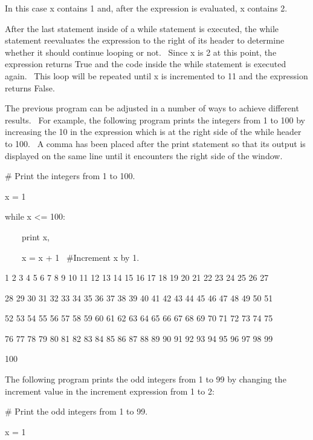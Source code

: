 \documentclass[12pt,twoside]{book}
\begin{document}
\bigskip

In this case x contains 1 and, after the expression is evaluated, x contains 2.


\bigskip

After the last statement inside of a while statement is executed, the while statement reevaluates the expression to the right of its header to determine whether it should continue looping or not. \ Since x is 2 at this point, the expression returns True and the code inside the while statement is executed again. \ This loop will be repeated until x is incremented to 11 and the expression returns False. 

\bigskip

The previous program can be adjusted in a number of ways to achieve different results. \ For example, the following program prints the integers from 1 to 100 by increasing the 10 in the expression which is at the right side of the while header to 100. \ A comma has been placed after the print statement so that its output is displayed on the same line until it encounters the right side of the window. 

\bigskip

\# Print the integers from 1 to 100.


\bigskip

x = 1 


\bigskip

while x {\textless}= 100:

\ \ \ \ print x,

\ \ \ \ x = x + 1 \ \#Increment x by 1.

{\textbar}

1 2 3 4 5 6 7 8 9 10 11 12 13 14 15 16 17 18 19 20 21 22 23 24 25 26 27

28 29 30 31 32 33 34 35 36 37 38 39 40 41 42 43 44 45 46 47 48 49 50 51

52 53 54 55 56 57 58 59 60 61 62 63 64 65 66 67 68 69 70 71 72 73 74 75

76 77 78 79 80 81 82 83 84 85 86 87 88 89 90 91 92 93 94 95 96 97 98 99

100 

The following program prints the odd integers from 1 to 99 by changing the increment value in the increment expression from 1 to 2: 

\bigskip

\# Print the odd integers from 1 to 99.


\bigskip

x = 1 
\end{document}

